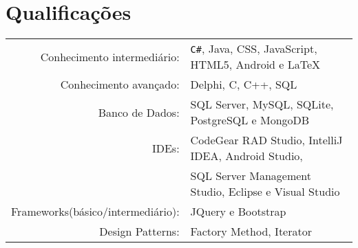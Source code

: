\documentclass[a4paper,10pt]{article}
\begin{document}
\section{Qualificações}

\begin{tabular}{rl}
Conhecimento intermediário: & \texttt{C\#}, Java, CSS, JavaScript, HTML5, Android e \LaTeX\\

Conhecimento avançado: & Delphi, C, C++, SQL\\

Banco de Dados: & SQL Server, MySQL,  SQLite, PostgreSQL e MongoDB \\

IDEs: & CodeGear RAD Studio, IntelliJ IDEA, Android Studio,\\
	& SQL Server Management Studio, Eclipse e Visual Studio\\

Frameworks(básico/intermediário): & JQuery e Bootstrap \\

Design Patterns: & Factory Method, Iterator \\

\end{tabular}






\end{document}
